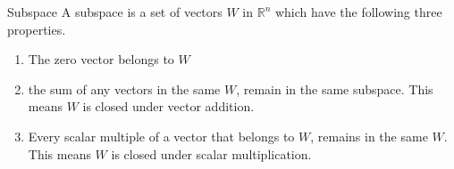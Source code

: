 \begin{definition}{Subspace}
A subspace is a set of vectors $W$ in $\mathbb{R}^n$ which have the following three properties. 

\begin{enumerate}
    \item The zero vector belongs to $W$\\
    \item the sum of any vectors in the same $W$, remain in the same subspace. This means $W$ is closed under vector addition.
    \item Every scalar multiple of a vector that belongs to $W$, remains in the same $W$. This means $W$ is closed under scalar multiplication.
\end{enumerate}
\cite[227]{LiAl}
\label{exa:SubspaceDef}
\end{definition}
